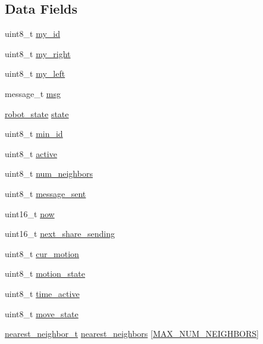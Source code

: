 \subsection*{Data Fields}
\begin{DoxyCompactItemize}
\item 
uint8\+\_\+t \hyperlink{struct_u_s_e_r_d_a_t_a_aa9d08e528bddaed76cb3ae2b3924e324}{my\+\_\+id}
\item 
uint8\+\_\+t \hyperlink{struct_u_s_e_r_d_a_t_a_acbbffd108b3e03fad207386744a5f5b7}{my\+\_\+right}
\item 
uint8\+\_\+t \hyperlink{struct_u_s_e_r_d_a_t_a_a7011a389bc4e0674c6d0d3dd1890c1a3}{my\+\_\+left}
\item 
message\+\_\+t \hyperlink{struct_u_s_e_r_d_a_t_a_a1bac7c8cafc9909ba9c076214a6b0c0b}{msg}
\item 
\hyperlink{ring_8h_a69b20b1a04c8e4cf3b72851b966259ec}{robot\+\_\+state} \hyperlink{struct_u_s_e_r_d_a_t_a_aadbb2fcd5b6edab38e3aa5aca6d92439}{state}
\item 
uint8\+\_\+t \hyperlink{struct_u_s_e_r_d_a_t_a_a5e6aae6522176125f4d02bba8ca5fe0c}{min\+\_\+id}
\item 
uint8\+\_\+t \hyperlink{struct_u_s_e_r_d_a_t_a_a05c940dbc220f5a723afd70071aebff8}{active}
\item 
uint8\+\_\+t \hyperlink{struct_u_s_e_r_d_a_t_a_ad87a0d3ed21e9d4050ce0eb138cb75b8}{num\+\_\+neighbors}
\item 
uint8\+\_\+t \hyperlink{struct_u_s_e_r_d_a_t_a_a83d1c1b9d1b27855cb1a36e755d73eb7}{message\+\_\+sent}
\item 
uint16\+\_\+t \hyperlink{struct_u_s_e_r_d_a_t_a_a95a543e244114d2368350d934a7392a6}{now}
\item 
uint16\+\_\+t \hyperlink{struct_u_s_e_r_d_a_t_a_aa0bb700e10f8de7a4a6a179e45ff78c6}{next\+\_\+share\+\_\+sending}
\item 
uint8\+\_\+t \hyperlink{struct_u_s_e_r_d_a_t_a_a01bba9e445a0f16707267c0ce23fb9b0}{cur\+\_\+motion}
\item 
uint8\+\_\+t \hyperlink{struct_u_s_e_r_d_a_t_a_a5cc036cf4f95c1f908b0253c67e6635d}{motion\+\_\+state}
\item 
uint8\+\_\+t \hyperlink{struct_u_s_e_r_d_a_t_a_a517ee3480ceae26e41c5807b94d1b3f3}{time\+\_\+active}
\item 
uint8\+\_\+t \hyperlink{struct_u_s_e_r_d_a_t_a_abf42309d619908c1318ec92fbd16cc6f}{move\+\_\+state}
\item 
\hyperlink{structnearest__neighbor__t}{nearest\+\_\+neighbor\+\_\+t} \hyperlink{struct_u_s_e_r_d_a_t_a_a7f78c5c44fd57c77fbc79f8f47913cac}{nearest\+\_\+neighbors} \mbox{[}\hyperlink{ring_8h_a7f85654336ae45adee0001ba8cdb8851}{M\+A\+X\+\_\+\+N\+U\+M\+\_\+\+N\+E\+I\+G\+H\+B\+O\+RS}\mbox{]}

\end{DoxyCompactItemize}
